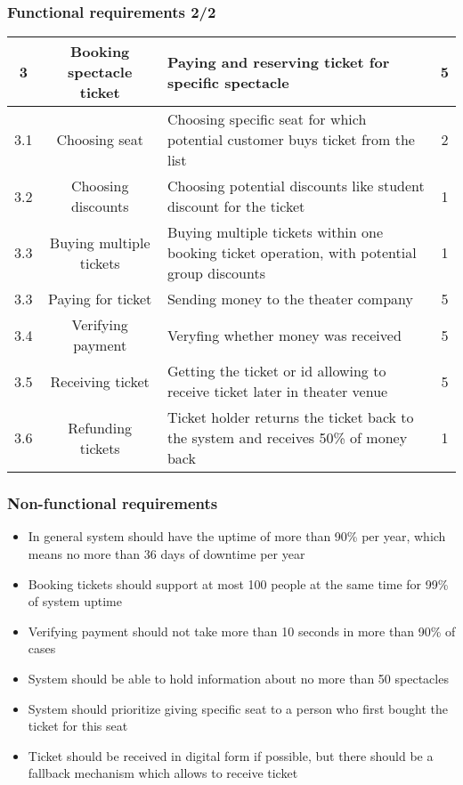 \documentclass[12pt]{article}
\begin{document}
\subsubsection{Functional requirements 2/2}
\begin{tabular}{| c | c | p{5cm} | c | }
    \hline 
  3 & Booking spectacle ticket & Paying and reserving ticket for specific spectacle & 5 \\ \hline 
  3.1 & Choosing seat & Choosing specific seat for which potential customer buys ticket from the list & 2 \\ \hline 
  3.2 & Choosing discounts & Choosing potential discounts like student discount for the ticket & 1 \\ \hline 
  3.3 & Buying multiple tickets & Buying multiple tickets within one booking ticket operation, with potential group discounts & 1 \\ \hline 
  3.3 & Paying for ticket & Sending money to the theater company & 5 \\ \hline 
  3.4 & Verifying payment & Veryfing whether money was received & 5 \\ \hline 
  3.5 & Receiving ticket & Getting the ticket or id allowing to receive ticket later in theater venue & 5 \\ \hline 
  3.6 & Refunding tickets & Ticket holder returns the ticket back to the system and receives 50\% of money back & 1 \\ \hline 
\end{tabular}

\subsubsection{Non-functional requirements}
\begin{itemize} 
    \item In general system should have the uptime of more than 90\% per year, which means no more than 36 days of downtime per year  
    \item Booking tickets should support at most 100 people at the same time for 99\% of system uptime 
    \item Verifying payment should not take more than 10 seconds in more than 90\% of cases 
    \item System should be able to hold information about no more than 50 spectacles 
    \item System should prioritize giving specific seat to a person who first bought the ticket for this seat 
    \item Ticket should be received in digital form if possible, but there should be a fallback mechanism which allows to receive ticket 
\end{itemize}
\end{document}
